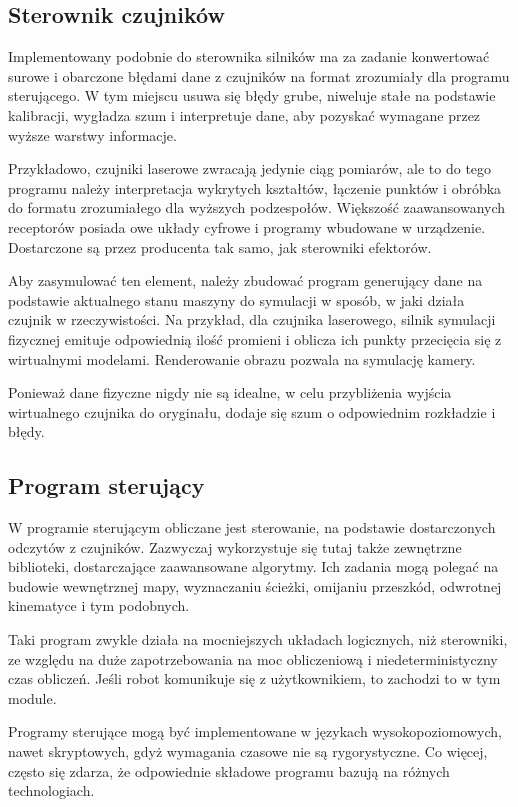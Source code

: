 	\subsection{Sterownik czujników}
	Implementowany podobnie do sterownika silników ma za zadanie konwertować surowe i obarczone błędami dane z czujników na format zrozumiały dla programu sterującego.
	W tym miejscu usuwa się błędy grube, niweluje stałe na podstawie kalibracji, wygładza szum i interpretuje dane, aby pozyskać wymagane przez wyższe warstwy informacje.

	Przykładowo, czujniki laserowe zwracają jedynie ciąg pomiarów, ale to do tego programu należy interpretacja wykrytych kształtów, łączenie punktów i obróbka do formatu zrozumiałego dla wyższych podzespołów.
	Większość zaawansowanych receptorów posiada owe układy cyfrowe i programy wbudowane w urządzenie.
	Dostarczone są przez producenta tak samo, jak sterowniki efektorów.
	
	Aby zasymulować ten element, należy zbudować program generujący dane na podstawie aktualnego stanu maszyny do symulacji w sposób, w jaki działa czujnik w rzeczywistości.
	Na przykład, dla czujnika laserowego, silnik symulacji fizycznej emituje odpowiednią ilość promieni i oblicza ich punkty przecięcia się z wirtualnymi modelami.
	Renderowanie obrazu pozwala na symulację kamery.

	Ponieważ dane fizyczne nigdy nie są idealne, w celu przybliżenia wyjścia wirtualnego czujnika do oryginału, dodaje się szum o odpowiednim rozkładzie i błędy.

	\subsection{Program sterujący}
	W programie sterującym obliczane jest sterowanie, na podstawie dostarczonych odczytów z czujników.
	Zazwyczaj wykorzystuje się tutaj także zewnętrzne biblioteki, dostarczające zaawansowane algorytmy.
	Ich zadania mogą polegać na budowie wewnętrznej mapy, wyznaczaniu ścieżki, omijaniu przeszkód, odwrotnej kinematyce i tym podobnych.

	Taki program zwykle działa na mocniejszych układach logicznych, niż sterowniki, ze względu na duże zapotrzebowania na moc obliczeniową
	i niedeterministyczny czas obliczeń.
	Jeśli robot komunikuje się z użytkownikiem, to zachodzi to w tym module. 

	Programy sterujące mogą być implementowane w językach wysokopoziomowych, nawet skryptowych, gdyż wymagania czasowe nie są rygorystyczne.
	Co więcej, często się zdarza, że odpowiednie składowe programu bazują na różnych technologiach.

